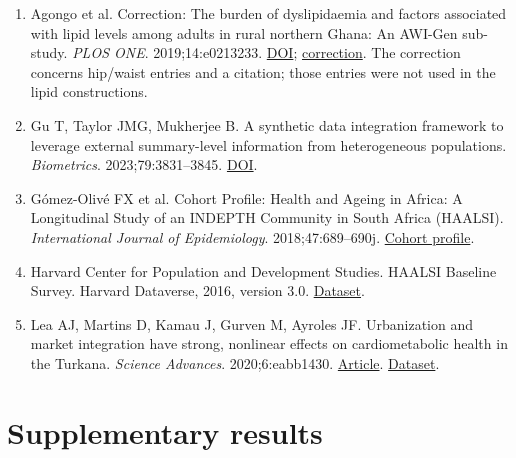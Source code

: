 \documentclass[sigconf,anonymous,review]{acmart}
\begin{document}
\begin{enumerate}
\item Agongo et al. Correction: The burden of dyslipidaemia and factors associated with lipid levels among adults in rural northern Ghana: An AWI-Gen sub-study. \emph{PLOS ONE}. 2019;14:e0213233. \href{https://doi.org/10.1371/journal.pone.0213233}{DOI}; \href{https://pmc.ncbi.nlm.nih.gov/articles/PMC6392312/}{correction}. The correction concerns hip/\allowbreak{}waist entries and a citation; those entries were not used in the lipid constructions.

\item Gu T, Taylor JMG, Mukherjee B. A synthetic data integration framework to leverage external summary-level information from heterogeneous populations. \emph{Biometrics}. 2023;79:3831–\allowbreak{}3845. \href{https://doi.org/10.1111/biom.13852}{DOI}.

\item Gómez-Olivé FX et al. Cohort Profile: Health and Ageing in Africa: A Longitudinal Study of an INDEPTH Community in South Africa (HAALSI). \emph{International Journal of Epidemiology}. 2018;47:689–\allowbreak{}690j. \href{https://doi.org/10.1093/ije/dyx247}{Cohort profile}.

\item Harvard Center for Population and Development Studies. HAALSI Baseline Survey. Harvard Dataverse, 2016, version 3.0. \href{https://doi.org/10.7910/DVN/F5YHML}{Dataset}.

\item Lea AJ, Martins D, Kamau J, Gurven M, Ayroles JF. Urbanization and market integration have strong, nonlinear effects on cardiometabolic health in the Turkana. \emph{Science Advances}. 2020;6:eabb1430. \href{https://doi.org/10.1126/sciadv.abb1430}{Article}. \href{https://doi.org/10.5061/dryad.2z34tmpjk}{Dataset}.

\end{enumerate}

\endgroup

\clearpage

\appendix

\section*{Supplementary results}

\setcounter{figure}{0}

\renewcommand{\thefigure}{S\arabic{figure}}

\setcounter{table}{0}

\renewcommand{\thetable}{S\arabic{table}}
\end{document}
